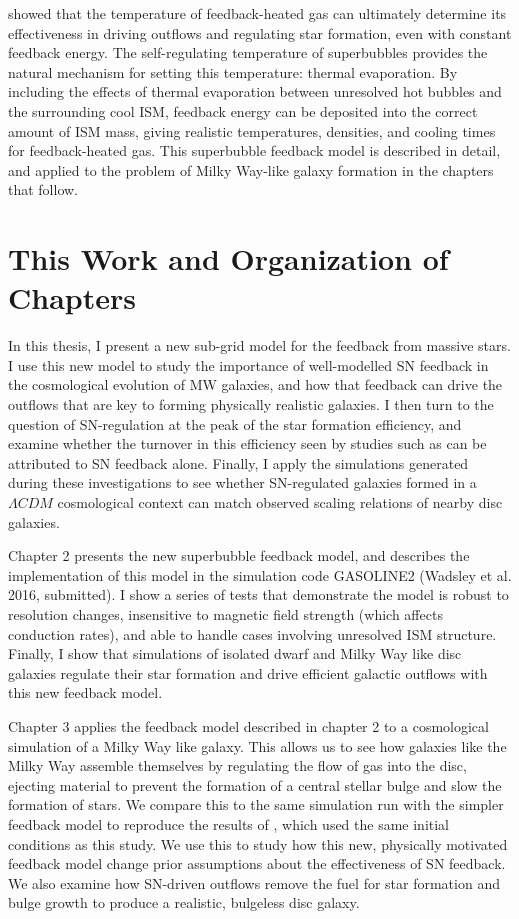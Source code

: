 \citet{DallaVecchia2012} showed that the temperature of feedback-heated gas can
ultimately determine its effectiveness in driving outflows and regulating star
formation, even with constant feedback energy.  The self-regulating temperature
of superbubbles provides the natural mechanism for setting this temperature:
thermal evaporation.  By including the effects of thermal evaporation between
unresolved hot bubbles and the surrounding cool ISM, feedback energy can be
deposited into the correct amount of ISM mass, giving realistic temperatures,
densities, and cooling times for feedback-heated gas.  This superbubble feedback
model is described in detail, and applied to the problem of Milky Way-like
galaxy formation in the chapters that follow.

\section{This Work and Organization of Chapters}
In this thesis, I present a new sub-grid model for the feedback from massive
stars.  I use this new model to study the importance of well-modelled SN
feedback in the cosmological evolution of MW galaxies, and how that feedback can
drive the outflows that are key to forming physically realistic galaxies.  I
then turn to the question of SN-regulation at the peak of the star formation
efficiency, and examine whether the turnover in this efficiency seen by studies
such as \citet{Behroozi2013,Moster2013} can be attributed to SN feedback alone.
Finally, I apply the simulations generated during these investigations to
see whether SN-regulated galaxies formed in a $\Lambda CDM$ cosmological context
can match observed scaling relations of nearby disc galaxies.

Chapter 2 presents the new superbubble feedback model, and describes the
implementation of this model in the simulation code {\sc GASOLINE2} (Wadsley et
al. 2016, submitted).  I show a series of tests that demonstrate the model is
robust to resolution changes, insensitive to magnetic field strength (which
affects conduction rates), and able to handle cases involving unresolved ISM
structure.  Finally, I show that simulations of isolated dwarf and Milky Way
like disc galaxies regulate their star formation and drive efficient galactic
outflows with this new feedback model.

Chapter 3 applies the feedback model described in chapter 2 to a cosmological
simulation of a Milky Way like galaxy.  This allows us to see how galaxies like
the Milky Way assemble themselves by regulating the flow of gas into the disc,
ejecting material to prevent the formation of a central stellar bulge and slow
the formation of stars.  We compare this to the same simulation run with the
simpler \citet{Stinson2006} feedback model to reproduce the results of
\citet{Stinson2010}, which used the same initial conditions as this study.  We
use this to study how this new, physically motivated feedback model change prior
assumptions about the effectiveness of SN feedback.  We also examine how
SN-driven outflows remove the fuel for star formation and bulge growth to
produce a realistic, bulgeless disc galaxy.

